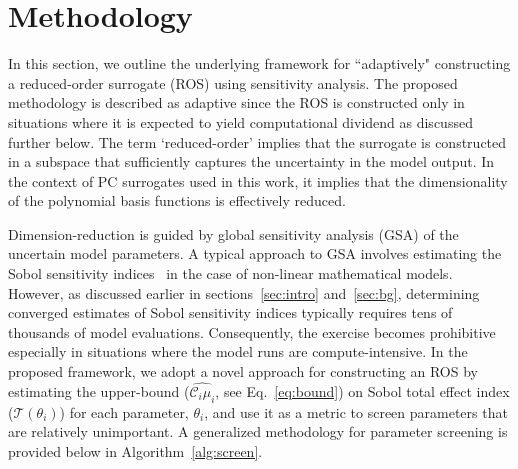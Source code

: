 \section{Methodology}
\label{sec:method}

%

In this section, we outline the underlying framework for ``adaptively" constructing a 
reduced-order surrogate (ROS) using sensitivity analysis.  The proposed methodology
is described as adaptive since the ROS is constructed only in situations where
it is expected to yield computational dividend as discussed further below. 
The term `reduced-order' implies that the surrogate is constructed in a 
subspace that sufficiently captures the uncertainty in the model output. 
In the context of PC surrogates used in this work, it implies that the dimensionality
of the polynomial basis functions is effectively reduced. 

Dimension-reduction is guided by global sensitivity analysis (GSA) of the uncertain model parameters. 
A typical approach to GSA involves estimating the Sobol sensitivity indices~\cite{Sobol:2001}
in the case of non-linear mathematical models. However, as discussed earlier in 
sections~\ref{sec:intro} and~\ref{sec:bg}, determining converged 
estimates of Sobol sensitivity indices typically requires tens of thousands
of model evaluations. Consequently, the exercise becomes prohibitive especially in
situations where the model runs are compute-intensive. In the proposed framework,
we adopt a novel approach for constructing an ROS by estimating the upper-bound 
($\widehat{\mathcal{C}_i\mu_i}$, see Eq.~\ref{eq:bound}) on Sobol total
effect index ($\mathcal{T}(\theta_i)$) for each parameter, $\theta_i$, and use it
as a metric to screen parameters that are relatively unimportant. A generalized
methodology for parameter screening is provided below in Algorithm~\ref{alg:screen}.

